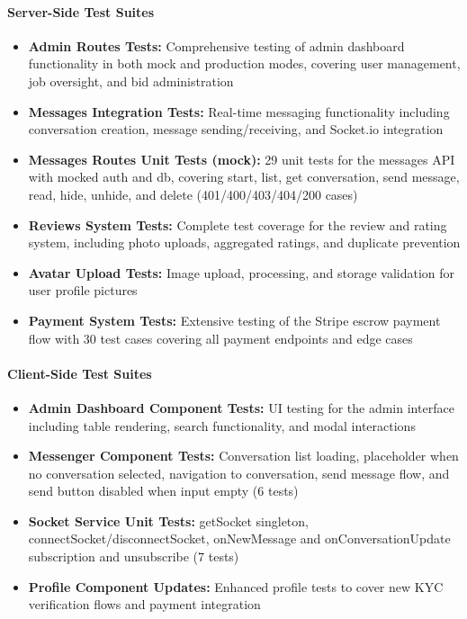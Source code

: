 \documentclass[11pt]{article}
\begin{document}
\paragraph{Server-Side Test Suites}
\begin{itemize}[leftmargin=1.4em]
  \item \textbf{Admin Routes Tests:} Comprehensive testing of admin dashboard functionality in both mock and production modes, covering user management, job oversight, and bid administration
  \item \textbf{Messages Integration Tests:} Real-time messaging functionality including conversation creation, message sending/receiving, and Socket.io integration
  \item \textbf{Messages Routes Unit Tests (mock):} 29 unit tests for the messages API with mocked auth and db, covering start, list, get conversation, send message, read, hide, unhide, and delete (401/400/403/404/200 cases)
  \item \textbf{Reviews System Tests:} Complete test coverage for the review and rating system, including photo uploads, aggregated ratings, and duplicate prevention
  \item \textbf{Avatar Upload Tests:} Image upload, processing, and storage validation for user profile pictures
  \item \textbf{Payment System Tests:} Extensive testing of the Stripe escrow payment flow with 30 test cases covering all payment endpoints and edge cases
\end{itemize}

\paragraph{Client-Side Test Suites}
\begin{itemize}[leftmargin=1.4em]
  \item \textbf{Admin Dashboard Component Tests:} UI testing for the admin interface including table rendering, search functionality, and modal interactions
  \item \textbf{Messenger Component Tests:} Conversation list loading, placeholder when no conversation selected, navigation to conversation, send message flow, and send button disabled when input empty (6 tests)
  \item \textbf{Socket Service Unit Tests:} getSocket singleton, connectSocket/disconnectSocket, onNewMessage and onConversationUpdate subscription and unsubscribe (7 tests)
  \item \textbf{Profile Component Updates:} Enhanced profile tests to cover new KYC verification flows and payment integration
\end{itemize}
\end{document}
